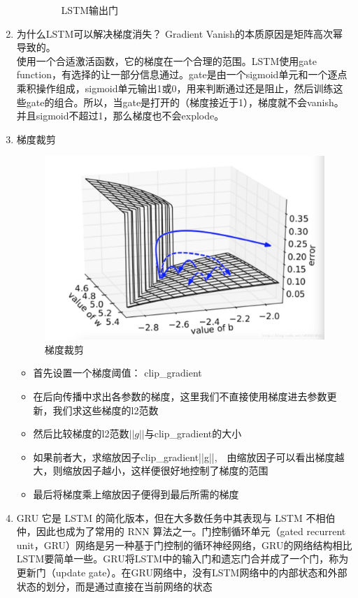 \begin{enumerate}
\begin{enumerate}
\begin{figure}[h]
			\caption{LSTM输出门}
		\end{figure}
		\end{enumerate}
		\item 为什么LSTM可以解决梯度消失？
		Gradient Vanish的本质原因是矩阵高次幂导致的。\\
		使用一个合适激活函数，它的梯度在一个合理的范围。LSTM使用gate function，有选择的让一部分信息通过。gate是由一个sigmoid单元和一个逐点乘积操作组成，sigmoid单元输出1或0，用来判断通过还是阻止，然后训练这些gate的组合。所以，当gate是打开的（梯度接近于1），梯度就不会vanish。并且sigmoid不超过1，那么梯度也不会explode。
		\item 梯度裁剪
		\begin{figure}[h]
			\centering
			\includegraphics[width=1\textwidth]{./Tex_files/gradientclipping.png}
			\caption{梯度裁剪}
		\end{figure}
		\begin{itemize}
			\item 首先设置一个梯度阈值： clip\_gradient
			\item 在后向传播中求出各参数的梯度，这里我们不直接使用梯度进去参数更新，我们求这些梯度的l2范数
			\item 然后比较梯度的l2范数$||g||$与clip\_gradient的大小
			\item 如果前者大，求缩放因子clip\_gradient\/||g||,　由缩放因子可以看出梯度越大，则缩放因子越小，这样便很好地控制了梯度的范围
			\item 最后将梯度乘上缩放因子便得到最后所需的梯度 
		\end{itemize}
		\item GRU
		它是 LSTM 的简化版本，但在大多数任务中其表现与 LSTM 不相伯仲，因此也成为了常用的 RNN 算法之一。门控制循环单元（gated recurrent unit，GRU）网络是另一种基于门控制的循环神经网络，GRU的网络结构相比LSTM要简单一些。GRU将LSTM中的输入门和遗忘门合并成了一个门，称为更新门（update gate）。在GRU网络中，没有LSTM网络中的内部状态和外部状态的划分，而是通过直接在当前网络的状态

\end{enumerate}
